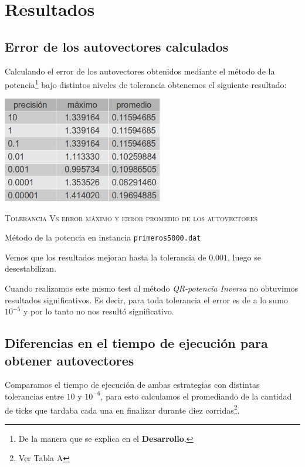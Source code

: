 \section{Resultados}

	\subsection{Error de los autovectores calculados}
		
		Calculando el error de los autovectores obtenidos mediante el m\'etodo
		de la potencia\footnote{De la manera que se explica en el \textbf{Desarrollo}.}
		bajo distintos niveles de tolerancia obtenemos el siguiente resultado:

		\vspace{5mm}
		\centerline{\includegraphics[width=7cm]{img/maxMed.png}}
		\centerline{\textsc{Tolerancia Vs error m\'aximo y error promedio de los autovectores}}
		\centerline{M\'etodo de la potencia en instancia \texttt{primeros5000.dat}}
		\vspace{5mm}

		Vemos que los resultados mejoran hasta la tolerancia de $0.001$, luego se
		desestabilizan.

		Cuando realizamos este mismo test al m\'etodo \textit{QR-potencia Inversa}
		no obtuvimos resultados significativos. Es decir, para toda tolerancia el
		error es de a lo sumo $10^{-5}$ y por lo tanto no nos result\'o significativo.

	\subsection{Diferencias en el tiempo de ejecuci\'on para obtener autovectores}

		Comparamos el tiempo de ejecuci\'on de ambas estrategias con distintas tolerancias entre $10$ y 
		$10^{-6}$, para esto calculamos el promediando de la cantidad de ticks que tardaba cada una en 
		finalizar durante diez corridas\footnote{ Ver Tabla A }.

